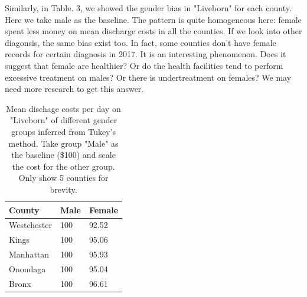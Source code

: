 \documentclass[10pt,twocolumn,letterpaper]{article}
\begin{document}
Similarly, in Table. 3, we showed the gender bias in "Liveborn" for each county. Here we take male as the baseline. The pattern is quite homogeneous here: female spent less money on mean discharge costs in all the counties. If we look into other diagonsis, the same bias exist too. In fact, some counties don't have female records for certain diagnosis in 2017. It is an interesting phenomenon. Does it suggest that female are healthier? Or do the health facilities tend to perform excessive treatment on males? Or there is undertreatment on females? We may need more research to get this answer.
\begin{table}[]
\small
\begin{center}
\label{anova-gender-birth}
\begin{tabular}{|l|l|l|}
\hline
\textbf{County} & \textbf{Male} & \textbf{Female} \\ \hline
Westchester     & 100           & 92.52           \\ \hline
Kings           & 100           & 95.06           \\ \hline
Manhattan       & 100           & 95.93           \\ \hline
Onondaga        & 100           & 95.04           \\ \hline
Bronx           & 100           & 96.61           \\ \hline
\end{tabular}
\end{center}
\caption{Mean dischage costs per day on "Liveborn" of different gender groups inferred from Tukey's method. Take group "Male" as the baseline (\$100) and scale the cost for the other group. Only show 5 counties for brevity.}
\end{table}
\end{document}
